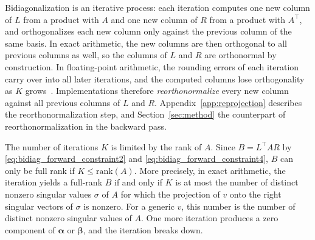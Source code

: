 \documentclass[a4paper,12pt]{article}
\theoremstyle{definition}
\begin{document}
Bidiagonalization is an iterative process: each iteration computes one new column of $L$ from a product with $A$ and one new column of $R$ from a product with $A^\top$, and orthogonalizes each new column only against the previous column of the same basis. In exact arithmetic, the new columns are then orthogonal to all previous columns as well, so the columns of $L$ and $R$ are orthonormal by construction. In floating-point arithmetic, the rounding errors of each iteration carry over into all later iterations, and the computed columns lose orthogonality as $K$ grows~\citep{paige1971computation}. Implementations therefore \emph{reorthonormalize} every new column against all previous columns of $L$ and $R$. Appendix~\ref{app:reprojection} describes the reorthonormalization step, and Section~\ref{sec:method} the counterpart of reorthonormalization in the backward pass.

The number of iterations $K$ is limited by the rank of $A$. Since $B = L^\top A R$ by \eqref{eq:bidiag_forward_constraint2} and \eqref{eq:bidiag_forward_constraint4}, $B$ can only be full rank if $K \leq \text{rank}(A)$. More precisely, in exact arithmetic, the iteration yields a full-rank $B$ if and only if $K$ is at most the number of distinct nonzero singular values $\sigma$ of $A$ for which the projection of $v$ onto the right singular vectors of $\sigma$ is nonzero. For a generic $v$, this number is the number of distinct nonzero singular values of $A$. One more iteration produces a zero component of $\boldsymbol{\alpha}$ or $\boldsymbol{\beta}$, and the iteration breaks down.
\end{document}
